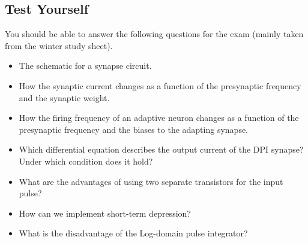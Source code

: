 \subsection{Test Yourself}

You should be able to answer the following questions for the exam (mainly taken from the winter study sheet).

\begin{itemize}
    \item The schematic for a synapse circuit.
    \item How the synaptic current changes as a function of the presynaptic frequency and the synaptic weight.
    \item How the firing frequency of an adaptive neuron changes as a function of the presynaptic frequency and the biases to the adapting synapse.
    \item Which differential equation describes the output current of the DPI synapse? Under which condition does it hold?
    \item What are the advantages of using two separate transistors for the input pulse?
    \item How can we implement short-term depression?
    \item What is the disadvantage of the Log-domain pulse integrator?
\end{itemize}